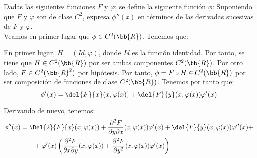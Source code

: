 \documentclass[12pt]{article}
\begin{document}
    \begin{ejercicio}
        Dadas las siguientes funciones $F$ y $\varphi$:
        se define la siguiente función $\phi$:
        Suponiendo que $F$ y $\varphi$ son de clase $C^2$, expresa $\phi''(x)$ en términos de las derivadas sucesivas de $F$ y $\varphi$.\\

        Veamos en primer lugar que $\phi\in C^2(\bb{R})$. Tenemos que:
        \begin{figure}[H]
            \centering
        \end{figure}
        En primer lugar, $H=(Id, \varphi)$, donde $Id$ es la función identidad. Por tanto, se tiene que $H\in C^2(\bb{R})$ por ser ambas componentes $C^2(\bb{R})$. Por otro lado, $F\in C^2(\bb{R}^2)$ por hipótesis. Por tanto, $\phi=F\circ H\in C^2(\bb{R})$ por ser composición de funciones de clase $C^2(\bb{R})$.
        Tenemos por tanto que:
        \begin{equation*}
            \phi'(x) = \del{F}{x}(x,\varphi(x)) + \del{F}{y}(x,\varphi(x))\varphi'(x)
        \end{equation*}
        
        Derivando de nuevo, tenemos:
        \begin{align*}
            \phi''(x) &= \Del{2}{F}{x}(x,\varphi(x)) +
            \dfrac{\partial^2F}{\partial y \partial x} (x,\varphi(x))\varphi'(x) +
            \del{F}{y}(x,\varphi(x))\varphi''(x) +\\&\qquad +
            \varphi'(x)\left(\dfrac{\partial^2 F}{\partial x \partial y}(x,\varphi(x)) + \dfrac{\partial^2 F}{\partial y^2}(x,\varphi(x))\varphi'(x)\right)
        \end{align*}
    \end{ejercicio}
\end{document}
